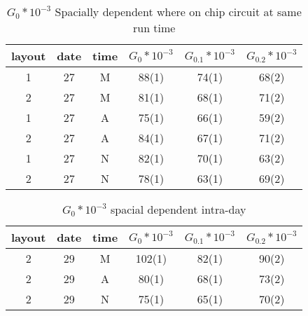 \documentclass[main.tex]{subfiles}
\begin{document}
\begin{table}
\begin{tabular}{cccccc}
layout & date & time & $G_0*10^{-3}$ & $G_{0.1} * 10^{-3}$ & $G_{0.2} * 10^{-3}$\\\hline
1 & 27 & M & 88(1) & 74(1) & 68(2)\\
2 & 27 & M & 81(1) & 68(1) & 71(2)\\
1 & 27 & A & 75(1) & 66(1) & 59(2)\\
2 & 27 & A & 84(1) & 67(1) & 71(2)\\
1 & 27 & N & 82(1) & 70(1) & 63(2)\\
2 & 27 & N & 78(1) & 63(1) & 69(2)\\
\end{tabular}
\caption{$G_0 * 10^{-3}$ Spacially dependent where on chip circuit at same run time}
\end{table}

\begin{table}
\begin{tabular}{cccccc}
layout & date & time & $G_0*10^{-3}$ & $G_{0.1} * 10^{-3}$ & $G_{0.2} * 10^{-3}$\\\hline
2 & 29 & M & 102(1) & 82(1) & 90(2)\\
2 & 29 & A & 80(1) & 68(1) & 73(2)\\
2 & 29 & N & 75(1) & 65(1) & 70(2)\\
\end{tabular}
\caption{$G_0 * 10^{-3}$ spacial dependent intra-day }
\end{table}
\end{document}
